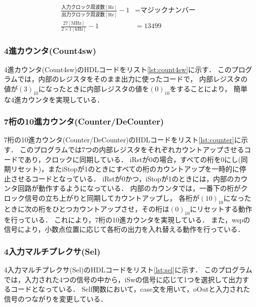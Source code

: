\documentclass[a4paper,11pt]{ltjsarticle}
\begin{document}
\begin{align}
    \frac{\text{入力クロック周波数}[\text{Hz}]}{\text{出力クロック周波数}[\text{Hz}]} - 1 & = \text{マジックナンバー} \\
    \frac{27[\text{MHz}]}{2 \times 1[\text{kHz}]} - 1                   & = 13499
\end{align}
\newpage

\subsubsection{4進カウンタ(Count4sw)}
4進カウンタ(Count4sw)のHDLコードをリスト\ref{lst:count4sw}に示す．
このプログラムでは，内部のレジスタをそのまま出力に使ったコードで，
内部レジスタの値が$(3)_{10}$になったときに内部レジスタの値を$(0)_{10}$をすることにより，
簡単な4進カウンタを実現している．

\subsubsection{7桁の10進カウンタ(Counter/DeCounter)}
7桁の10進カウンタ(Counter/DeCounter)のHDLコードをリスト\ref{lst:counter}に示す．
このプログラムでは7つの内部レジスタをそれぞれカウントアップさせるコードであり，クロックに同期している．
iRstが0の場合，すべての桁を0にし(同期リセット)，またiStopが1のときにすべての桁のカウントアップを一時的に停止させるコードとなっている．
iRstが0かつ，iStopが1のときには，内部のカウンタ回路が動作するようになっている．
内部のカウンタでは，一番下の桁がクロック信号の立ち上がりと同期してカウントアップし，
各桁が$(10)_{10}$になったときに次の桁をひとつカウントアップさせ，その桁は$(0)_{10}$にリセットする動作を行っている．
これにより，7桁の10進カウンタを実現している．
また，wspの信号により，小数点位置に応じて各桁の出力を入れ替える動作を行っている．

\subsubsection{4入力マルチプレクサ(Sel)}
4入力マルチプレクサ(Sel)のHDLコードをリスト\ref{lst:sel}に示す．
このプログラムでは，入力された4つの信号の中から，iSwの信号に応じて1つを選択して出力するコードとなっている．
Self関数において，case文を用いて，oOutと入力された信号のつながりを変更している．
\newpage

\end{document}
